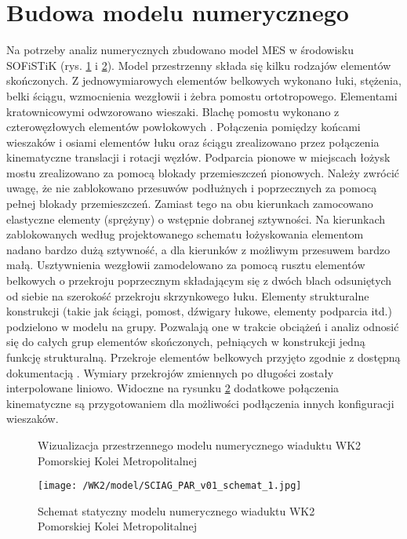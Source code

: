 \section{Budowa modelu numerycznego} \label{sect:wk2_basic_num_model}

Na potrzeby analiz numerycznych zbudowano model MES w środowisku SOFiSTiK (rys. \ref{fig: model_wk2_visualization} i \ref{fig: model_wk2_static_scheme}). Model przestrzenny składa się kilku rodzajów elementów skończonych. Z jednowymiarowych elementów belkowych wykonano łuki, stężenia, belki ściągu, wzmocnienia wezgłowii i żebra pomostu ortotropowego. Elementami kratownicowymi odwzorowano wieszaki. Blachę pomostu wykonano z czterowęzłowych elementów powłokowych \parencite{SOFISTIK2018b}. Połączenia pomiędzy końcami wieszaków i osiami elementów łuku oraz ściągu zrealizowano przez połączenia kinematyczne translacji i rotacji węzłów. Podparcia pionowe w miejscach łożysk mostu zrealizowano za pomocą blokady przemieszczeń pionowych. Należy zwrócić uwagę, że nie zablokowano przesuwów podłużnych i poprzecznych za pomocą pełnej blokady przemieszczeń. Zamiast tego na obu kierunkach zamocowano elastyczne elementy (sprężyny) o wstępnie dobranej sztywności. Na kierunkach zablokowanych według projektowanego schematu łożyskowania elementom nadano bardzo dużą sztywność, a dla kierunków z możliwym przesuwem bardzo małą. Usztywnienia wezgłowii zamodelowano za pomocą rusztu elementów belkowych o przekroju poprzecznym składającym się z dwóch blach odsuniętych od siebie na szerokość przekroju skrzynkowego łuku. Elementy strukturalne konstrukcji (takie jak ściągi, pomost, dźwigary łukowe, elementy podparcia itd.) podzielono w modelu na grupy. Pozwalają one w trakcie obciążeń i analiz odnosić się do całych grup elementów skończonych, pełniących w konstrukcji jedną funkcję strukturalną. Przekroje elementów belkowych przyjęto zgodnie z dostępną dokumentacją \parencite{TransprojektGdanski2014}. Wymiary przekrojów zmiennych po długości zostały interpolowane liniowo. Widoczne na rysunku \ref{fig: model_wk2_static_scheme} dodatkowe połączenia kinematyczne są przygotowaniem dla możliwości podłączenia innych konfiguracji wieszaków.



\begin{figure}[hbt!]
	\centering
	\captionsetup{justification=centering}
	\caption{Wizualizacja przestrzennego modelu numerycznego wiaduktu WK2 Pomorskiej Kolei Metropolitalnej}
	\label{fig: model_wk2_visualization}
	
\end{figure}
\begin{figure}[hbt!]
	\centering
	\texttt{[image: /WK2/model/SCIAG\_PAR\_v01\_schemat\_1.jpg]}
	\captionsetup{justification=centering}
	\caption{Schemat statyczny modelu numerycznego wiaduktu WK2 Pomorskiej Kolei Metropolitalnej}
	\label{fig: model_wk2_static_scheme}
\end{figure}

